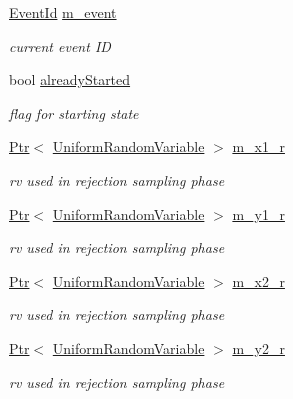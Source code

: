 \begin{DoxyCompactItemize}
\hyperlink{classns3_1_1EventId}{Event\+Id} \hyperlink{classns3_1_1SteadyStateRandomWaypointMobilityModel_ae57dec0ef026e81c8d9ad3981394b228}{m\+\_\+event}
\begin{DoxyCompactList}\small\item\em current event ID \end{DoxyCompactList}\item 
bool \hyperlink{classns3_1_1SteadyStateRandomWaypointMobilityModel_ae3f6be410c7eb579aab40908b80c2e32}{already\+Started}
\begin{DoxyCompactList}\small\item\em flag for starting state \end{DoxyCompactList}\item 
\hyperlink{classns3_1_1Ptr}{Ptr}$<$ \hyperlink{classns3_1_1UniformRandomVariable}{Uniform\+Random\+Variable} $>$ \hyperlink{classns3_1_1SteadyStateRandomWaypointMobilityModel_a8b25948c226f0b28f5f958fa32157877}{m\+\_\+x1\+\_\+r}
\begin{DoxyCompactList}\small\item\em rv used in rejection sampling phase \end{DoxyCompactList}\item 
\hyperlink{classns3_1_1Ptr}{Ptr}$<$ \hyperlink{classns3_1_1UniformRandomVariable}{Uniform\+Random\+Variable} $>$ \hyperlink{classns3_1_1SteadyStateRandomWaypointMobilityModel_adb2d5dc1a84e75615445b99d6b644f9b}{m\+\_\+y1\+\_\+r}
\begin{DoxyCompactList}\small\item\em rv used in rejection sampling phase \end{DoxyCompactList}\item 
\hyperlink{classns3_1_1Ptr}{Ptr}$<$ \hyperlink{classns3_1_1UniformRandomVariable}{Uniform\+Random\+Variable} $>$ \hyperlink{classns3_1_1SteadyStateRandomWaypointMobilityModel_a4d9efa1dda69dcb5aa455643e9524edb}{m\+\_\+x2\+\_\+r}
\begin{DoxyCompactList}\small\item\em rv used in rejection sampling phase \end{DoxyCompactList}\item 
\hyperlink{classns3_1_1Ptr}{Ptr}$<$ \hyperlink{classns3_1_1UniformRandomVariable}{Uniform\+Random\+Variable} $>$ \hyperlink{classns3_1_1SteadyStateRandomWaypointMobilityModel_a45e27842ca089b8828735d15795ed680}{m\+\_\+y2\+\_\+r}
\begin{DoxyCompactList}\small\item\em rv used in rejection sampling phase \end{DoxyCompactList}\item 

\end{DoxyCompactItemize}
